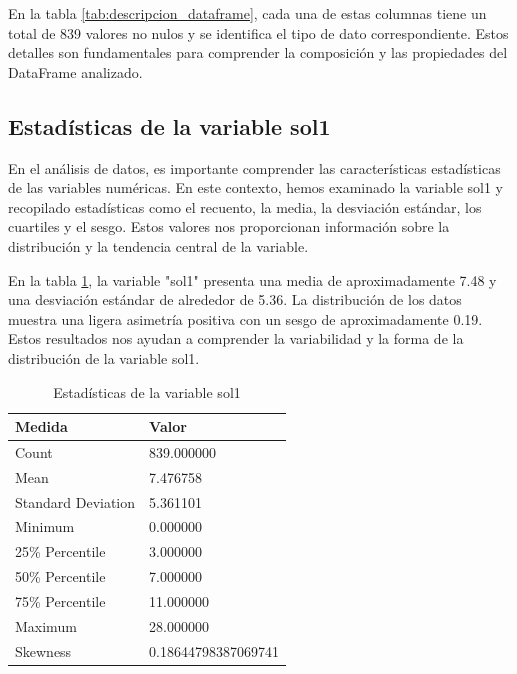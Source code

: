 En la tabla \ref{tab:descripcion_dataframe}, cada una de estas columnas tiene un total de
839 valores no nulos y se identifica el tipo de dato correspondiente. Estos
detalles son fundamentales para comprender la composición y las propiedades del
DataFrame analizado.

\subsection{Estadísticas de la variable sol1}

En el análisis de datos, es importante comprender las características
estadísticas de las variables numéricas. En este contexto, hemos examinado la
variable sol1 y recopilado estadísticas como el recuento, la media, la
desviación estándar, los cuartiles y el sesgo. Estos valores nos proporcionan
información sobre la distribución y la tendencia central de la variable.

En la tabla \ref{tab:estadistica_variable_sol1}, la variable "sol1" presenta
una media de aproximadamente 7.48 y una desviación estándar de alrededor de
5.36. La distribución de los datos muestra una ligera asimetría positiva con un
sesgo de aproximadamente 0.19. Estos resultados nos ayudan a comprender la
variabilidad y la forma de la distribución de la variable sol1.

\begin{table}[htbp]
    \centering
    \caption{Estadísticas de la variable sol1}
    \begin{tabular}{ll}
        \hline
        \textbf{Medida}    & \textbf{Valor}      \\
        \hline
        Count              & 839.000000          \\
        Mean               & 7.476758            \\
        Standard Deviation & 5.361101            \\
        Minimum            & 0.000000            \\
        25\% Percentile    & 3.000000            \\
        50\% Percentile    & 7.000000            \\
        75\% Percentile    & 11.000000           \\
        Maximum            & 28.000000           \\
        Skewness           & 0.18644798387069741 \\
        \hline
    \end{tabular}%
    \label{tab:estadistica_variable_sol1}%
\end{table}%



